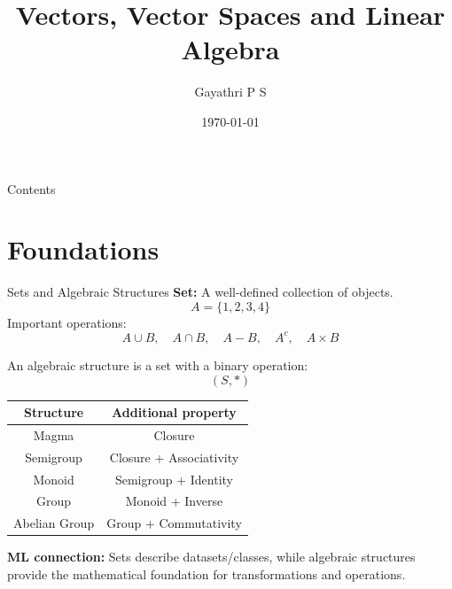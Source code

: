 \documentclass[aspectratio=169]{beamer}
\title{Vectors, Vector Spaces and Linear Algebra}
\author{Gayathri P S}
\date{\today}
\begin{document}
\frame{\titlepage}

\begin{frame}{Contents}
\tableofcontents
\end{frame}


\section{Foundations}

\begin{frame}{Sets and Algebraic Structures}
\textbf{Set:} A well-defined collection of objects.
\[
A=\{1,2,3,4\}
\]
Important operations:
\[
A\cup B,\quad A\cap B,\quad A-B,\quad A^c,\quad A\times B
\]

An algebraic structure is a set with a binary operation:
\[
(S,*)
\]

\begin{center}
\begin{tabular}{|c|c|}
\hline
\textbf{Structure} & \textbf{Additional property}\\
\hline
Magma & Closure\\
Semigroup & Closure + Associativity\\
Monoid & Semigroup + Identity\\
Group & Monoid + Inverse\\
Abelian Group & Group + Commutativity\\
\hline
\end{tabular}
\end{center}

\textbf{ML connection:} Sets describe datasets/classes, while algebraic structures provide the mathematical foundation for transformations and operations.
\end{frame}
\end{document}
